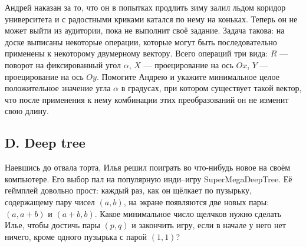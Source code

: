Андрей наказан за то, что он в попытках продлить зиму залил льдом коридор университета и с радостными криками катался по нему на коньках. Теперь он не может выйти из аудитории, пока не выполнит своё задание. Задача такова: на доске выписаны некоторые операции, которые могут быть последовательно применены к некоторому двумерному вектору. Всего операций три вида: $R$ --- поворот на фиксированный угол $\alpha$, $X$ --- проецирование на ось $Ox$, $Y$ --- проецирование на ось $Oy$. Помогите Андрею и укажите минимальное целое положительное значение угла $\alpha$ в градусах, при котором существует такой вектор, что после применения к нему комбинации этих преобразований он не изменит свою длину.






\subsection*{D. Deep tree}

Наевшись до отвала торта, Илья решил поиграть во что-нибудь новое на своём компьютере. Его выбор пал на популярную инди--игру SuperMegaDeepTree. Её геймплей довольно прост: каждый раз, как он щёлкает по пузырьку, содержащему пару чисел $(a, b)$, на экране появляются две новых пары: $(a, a+b)$ и $(a+b, b)$. Какое минимальное число щелчков нужно сделать Илье, чтобы достичь пары $(p, q)$ и закончить игру, если в начале у него нет ничего, кроме одного пузырька с парой $(1, 1)$?







